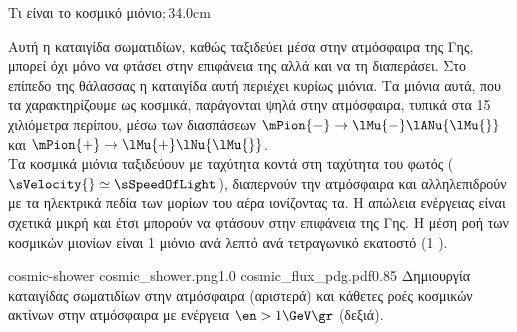 \begin{MyColumnLeft}[detach title,before upper={\tcbtitle\quad}]{Τι είναι το κοσμικό μιόνιο$;$}{34.0cm}

Αυτή η καταιγίδα σωματιδίων, καθώς ταξιδεύει μέσα στην ατμόσφαιρα
της Γης, μπορεί όχι μόνο να φτάσει στην επιφάνεια της αλλά και να τη
διαπεράσει. Στο επίπεδο της θάλασσας η καταιγίδα αυτή περιέχει
κυρίως μιόνια. Τα μιόνια αυτά, που τα χαρακτηρίζουμε ως κοσμικά, παράγονται
ψηλά στην ατμόσφαιρα, τυπικά στα 15 χιλιόμετρα περίπου, μέσω των διασπάσεων $\mPion{-}
\to \lMu{-}\lANu{\lMu{}}$ και $\mPion{+} \to \lMu{+}\lNu{\lMu{}}$.\\

Τα κοσμικά μιόνια ταξιδεύουν με ταχύτητα κοντά στη ταχύτητα του φωτός
($\sVelocity{}\simeq \sSpeedOfLight$), διαπερνούν την ατμόσφαιρα 
και αλληλεπιδρούν με τα ηλεκτρικά πεδία των μορίων του αέρα ιονίζοντας
τα. Η απώλεια ενέργειας είναι σχετικά μικρή και έτσι μπορούν
να φτάσουν στην επιφάνεια της Γης. Η μέση ροή των κοσμικών μιονίων
είναι 1 μιόνιο ανά λεπτό ανά τετραγωνικό εκατοστό (1 \en{}\gr).

\twoFigPoster
{cosmic-shower}
{cosmic_shower.png}{1.0}
{cosmic_flux_pdg.pdf}{0.85}%
{Δημιουργία καταιγίδας σωματιδίων στην ατμόσφαιρα (αριστερά) και
  κάθετες ροές κοσμικών ακτίνων στην ατμόσφαιρα με ενέργεια $\en> 1\GeV\gr$ (δεξιά).}

\end{MyColumnLeft}

